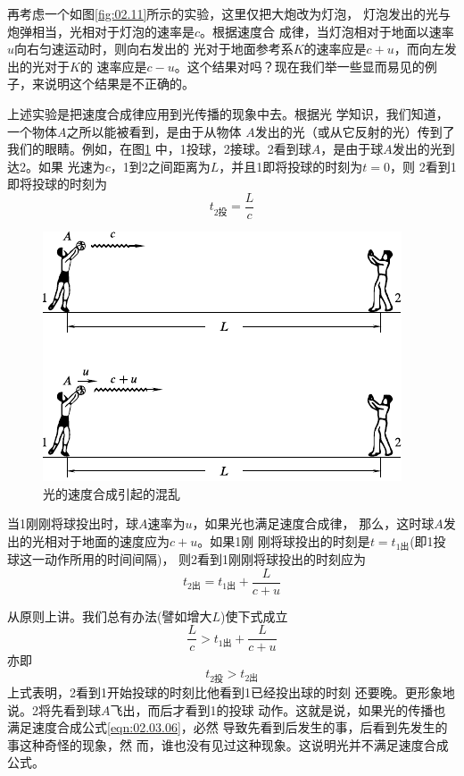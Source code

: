 再考虑一个如图\ref{fig:02.11}所示的实验，这里仅把大炮改为灯泡，
灯泡发出的光与炮弹相当，光相对于灯泡的速率是$c$。根据速度合
成律，当灯泡相对于地面以速率$u$向右匀速运动时，则向右发出的
光对于地面参考系$K$的速率应是$c+u$，而向左发出的光对于$K$的
速率应是$c-u$。这个结果对吗？现在我们举一些显而易见的例
子，来说明这个结果是不正确的。

上述实验是把速度合成律应用到光传播的现象中去。根据光
学知识，我们知道，一个物体$A$之所以能被看到，是由于从物体
$A$发出的光（或从它反射的光）传到了我们的眼睛。例如，在图\ref{fig:02.12}
中，1投球，2接球。2看到球$A$，是由于球$A$发出的光到达2。如果
光速为$c$，1到2之间距离为$L$，并且1即将投球的时刻为$t=0$，则
2看到1即将投球的时刻为
\begin{equation*}
  t_{2\text{投}}=\frac{L}{c}
\end{equation*}
\begin{figure}
  \centering
  \includegraphics{figure/fig02.12}
  \caption{光的速度合成引起的混乱}
  \label{fig:02.12}
\end{figure}%
当1刚刚将球投出时，球$A$速率为$u$，如果光也满足速度合成律，
那么，这时球$A$发出的光相对于地面的速度应为$c+u$。如果1刚
刚将球投出的时刻是$t=t_{1\text{出}}$(即1投球这一动作所用的时间间隔)，
则2看到1刚刚将球投出的时刻应为
\begin{equation*}
  t_{2\text{出}} = t_{1\text{出}} + \frac{L}{c+u}
\end{equation*}

从原则上讲。我们总有办法(譬如增大$L$)使下式成立
\begin{equation*}
  \frac{L}{c} > t_{1\text{出}} + \frac{L}{c+u}
\end{equation*}
亦即
\begin{equation*}
  t_{2\text{投}} > t_{2\text{出}}
\end{equation*}
上式表明，2看到1开始投球的时刻比他看到1已经投出球的时刻
还要晚。更形象地说。2将先看到球$A$飞出，而后才看到1的投球
动作。这就是说，如果光的传播也满足速度合成公式\eqref{eqn:02.03.06}，必然
导致先看到后发生的事，后看到先发生的事这种奇怪的现象，然
而，谁也没有见过这种现象。这说明光并不满足速度合成公式。

